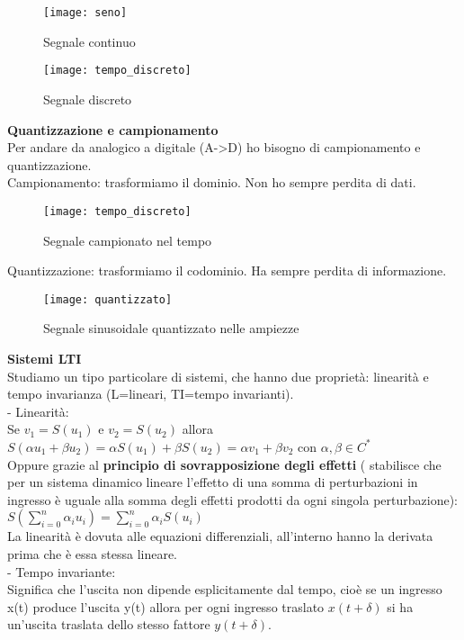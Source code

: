 \begin{figure}[h]
	\centering
	\texttt{[image: seno]}
	\caption{Segnale continuo}
	\label{fig:seno}
\end{figure}


\begin{figure}[h]
	\centering
	\texttt{[image: tempo\_discreto]}
	\caption{ Segnale discreto}
	\label{fig:tempodiscreto}
\end{figure}

\textbf{Quantizzazione e campionamento}\\
Per andare da analogico a digitale (A->D) ho bisogno di campionamento e quantizzazione.\\

Campionamento: trasformiamo il dominio. Non ho sempre perdita di dati.\\

\begin{figure}[h]
	\centering
	\texttt{[image: tempo\_discreto]}
	\caption{ Segnale campionato nel tempo}
	\label{fig:tempodiscreto}
\end{figure}

\pagebreak
Quantizzazione: trasformiamo il codominio. Ha sempre perdita di informazione.\\

\begin{figure}[h]
	\centering
	\texttt{[image: quantizzato]}
	\caption{ Segnale sinusoidale quantizzato nelle ampiezze}
	\label{fig:quantizzato}
\end{figure}

\textbf{Sistemi LTI}\\
Studiamo un tipo particolare di sistemi, che hanno due proprietà: linearità e tempo invarianza (L=lineari, TI=tempo invarianti).\\
- Linearità:\\
Se $ v_{1}=S(u_{1}) $ e $ v_{2}=S(u_{2})  $ 
allora $ S(\alpha u_{1} + \beta u_{2}) 
= \alpha S(u_{1}) + \beta S(u_{2})
= \alpha v_{1} + \beta v_{2} $ con $ \alpha , \beta \in C^{*} $ \\
Oppure grazie al \textbf{principio di sovrapposizione degli effetti} ( stabilisce che per un sistema dinamico lineare l'effetto di una somma di perturbazioni in ingresso è uguale alla somma degli effetti prodotti da ogni singola perturbazione): \\
$ S( \sum_{i=0}^n \alpha_i u_i ) 
=  \sum_{i=0}^n \alpha_i S( u_i )
$ \\
La linearità è dovuta alle equazioni differenziali, all'interno hanno la derivata prima che è essa stessa lineare.\\
- Tempo invariante:\\
 Significa che l'uscita non dipende esplicitamente dal tempo, cioè se un ingresso x(t) produce l'uscita y(t) allora per ogni ingresso traslato $x(t+ \delta )$ si ha un'uscita traslata dello stesso fattore $y(t+ \delta )$.\\
 
